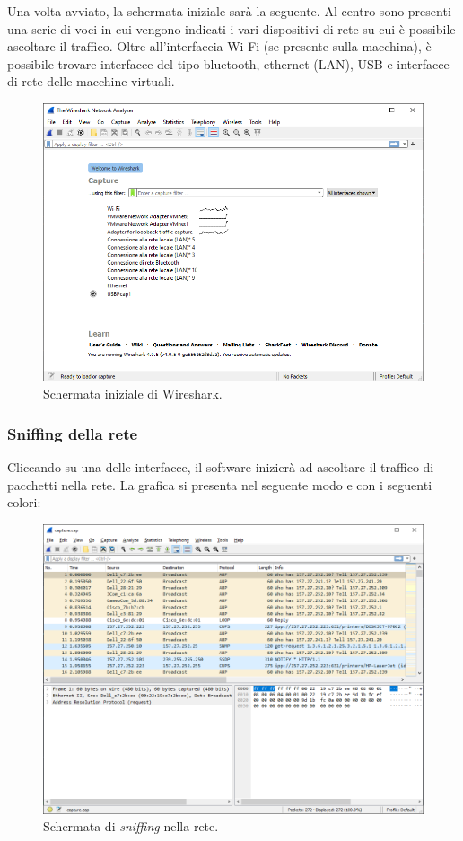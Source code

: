 \documentclass[a4paper]{article}
\begin{document}
	Una volta avviato, la schermata iniziale sarà la seguente. Al centro sono presenti una serie di voci in cui vengono indicati i vari dispositivi di rete su cui è possibile ascoltare il traffico. Oltre all'interfaccia Wi-Fi (se presente sulla macchina), è possibile trovare interfacce del tipo bluetooth, ethernet (LAN), USB e interfacce di rete delle macchine virtuali.
	\begin{figure}[!htp]
		\centering
		\includegraphics[width=\textwidth]{img/wireshark/grafica-wireshark-1.png}
		\caption{Schermata iniziale di Wireshark.}
	\end{figure}\newpage

	\subsubsection{Sniffing della rete}

	Cliccando su una delle interfacce, il software inizierà ad ascoltare il traffico di pacchetti nella rete. La grafica si presenta nel seguente modo e con i seguenti colori:
	\begin{figure}[!htp]
		\centering
		\includegraphics[width=\textwidth]{img/wireshark/grafica-wireshark-2.png}
		\caption{Schermata di \emph{sniffing} nella rete.}
	\end{figure}
\end{document}
